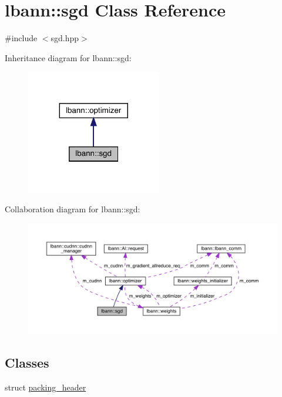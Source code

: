 \hypertarget{classlbann_1_1sgd}{}\section{lbann\+:\+:sgd Class Reference}
\label{classlbann_1_1sgd}


{\ttfamily \#include $<$sgd.\+hpp$>$}



Inheritance diagram for lbann\+:\+:sgd\+:\nopagebreak
\begin{figure}[H]
\begin{center}
\leavevmode
\includegraphics[width=167pt]{classlbann_1_1sgd__inherit__graph}
\end{center}
\end{figure}


Collaboration diagram for lbann\+:\+:sgd\+:\nopagebreak
\begin{figure}[H]
\begin{center}
\leavevmode
\includegraphics[width=350pt]{classlbann_1_1sgd__coll__graph}
\end{center}
\end{figure}
\subsection*{Classes}
\begin{DoxyCompactItemize}
\item 
struct \hyperlink{structlbann_1_1sgd_1_1packing__header}{packing\+\_\+header}
\end{DoxyCompactItemize}
